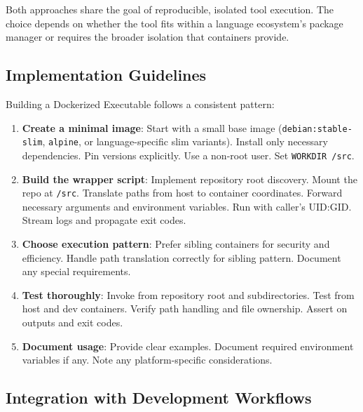 Both approaches share the goal of reproducible, isolated tool
execution. The choice depends on whether the tool fits within a language
ecosystem's package manager or requires the broader isolation that containers
provide.

\subsection{Implementation Guidelines}

Building a Dockerized Executable follows a consistent pattern:

\begin{enumerate}
  \item \textbf{Create a minimal image}: Start with a small base image
    (\texttt{debian:stable-slim}, \texttt{alpine}, or language-specific
    slim variants). Install only necessary dependencies. Pin versions explicitly.
    Use a non-root user. Set \texttt{WORKDIR /src}.

  \item \textbf{Build the wrapper script}: Implement repository root discovery.
    Mount the repo at \texttt{/src}. Translate paths from host to
    container coordinates. Forward necessary arguments and environment
    variables. Run with caller's UID:GID. Stream logs and propagate exit
    codes.

  \item \textbf{Choose execution pattern}: Prefer sibling containers for
    security and efficiency. Handle path translation correctly for
    sibling pattern. Document any special requirements.

  \item \textbf{Test thoroughly}: Invoke from repository root and subdirectories.
    Test from host and dev containers. Verify path handling and file ownership.
    Assert on outputs and exit codes.

  \item \textbf{Document usage}: Provide clear examples. Document
    required environment variables if any. Note any platform-specific considerations.
\end{enumerate}

\subsection{Integration with Development Workflows}

